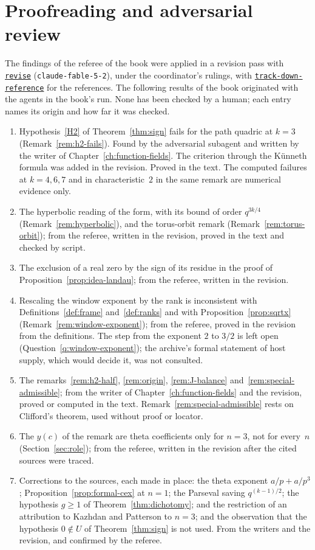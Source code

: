 \documentclass[11pt]{amsbook}
\theoremstyle{plain}
\theoremstyle{definition}
\theoremstyle{remark}
\numberwithin{equation}{section}
\numberwithin{figure}{chapter}
\numberwithin{table}{chapter}
\newcommand{\vtwoskillurl}{https://github.com/tdupu/%
agent-skills-public/blob/8d13efb5e66306aeae6e3b948bc463e7e2db1b65}
\newcommand{\vtwoskill}[1]{%
\href{\vtwoskillurl/skills/#1/SKILL.md}{\texttt{#1}}}
\begin{document}
\section{Proofreading and adversarial review}
\label{sec:ai-proofreading}
The findings of the referee of the book were applied in a revision
pass with \vtwoskill{revise} (\texttt{claude-fable-5-2}), under the
coordinator's rulings, with \vtwoskill{track-down-reference} for the
references. The following results of the book originated with the
agents in the book's run. None has been checked by a human; each entry
names its origin and how far it was checked.
\begin{enumerate}[label=(\roman*)]
\item Hypothesis~\ref{H2} of Theorem~\ref{thm:sign} fails for the path
quadric at $k=3$ (Remark~\ref{rem:h2-fails}). Found by the adversarial
subagent and written by the writer of Chapter~\ref{ch:function-fields}.
The criterion through the K\"unneth formula was added in the revision.
Proved in the text. The computed failures at $k=4,6,7$ and in
characteristic~$2$ in the same remark are numerical evidence only.
\item The hyperbolic reading of the form, with its bound of order
$q^{3k/4}$ (Remark~\ref{rem:hyperbolic}), and the torus-orbit remark
(Remark~\ref{rem:torus-orbit}); from the referee, written in the
revision, proved in the text and checked by script.
\item The exclusion of a real zero by the sign of its residue in the
proof of Proposition~\ref{prop:idea-landau}; from the referee, written
in the revision.
\item Rescaling the window exponent by the rank is inconsistent with
Definitions~\ref{def:frame} and~\ref{def:ranks} and with
Proposition~\ref{prop:sqrtx} (Remark~\ref{rem:window-exponent}); from the
referee, proved in the revision from the definitions. The step from
the exponent $2$ to $3/2$ is left open
(Question~\ref{q:window-exponent}); the archive's formal statement of
host supply, which would decide it, was not consulted.
\item The remarks~\ref{rem:h2-half}, \ref{rem:origin},
\ref{rem:J-balance} and~\ref{rem:special-admissible}; from the writer
of Chapter~\ref{ch:function-fields} and the revision, proved or
computed in the text. Remark~\ref{rem:special-admissible} rests on
Clifford's theorem, used without proof or locator.
\item The $y(c)$ of the remark are theta coefficients only for $n=3$,
not for every~$n$ (Section~\ref{sec:role}); from the referee, written
in the revision after the cited sources were traced.
\item Corrections to the sources, each made in place: the theta
exponent $a/p+a/p^3$; Proposition~\ref{prop:formal-cex} at $n=1$; the
Parseval saving $q^{(k-1)/2}$; the hypothesis $g\ge1$ of
Theorem~\ref{thm:dichotomy}; and the restriction of an attribution to
Kazhdan and Patterson to $n=3$; and the observation that the
hypothesis $0\notin U$ of Theorem~\ref{thm:sign} is not used. From the
writers and the revision, and confirmed by the referee.
\end{enumerate}
\end{document}
